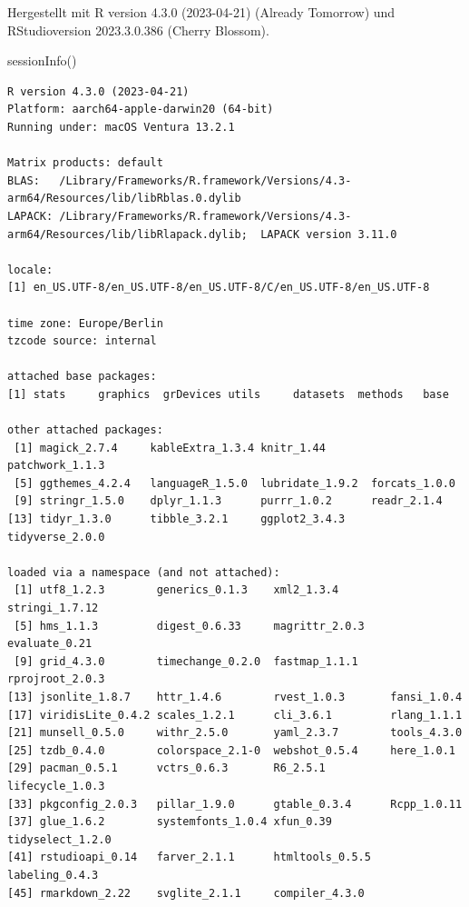 \documentclass[
  letterpaper,
  DIV=11]{scrartcl}
\newenvironment{Shaded}{\begin{snugshade}}{\end{snugshade}}
\newcommand{\FunctionTok}[1]{\textcolor[rgb]{0.28,0.35,0.67}{#1}}
\newcommand{\NormalTok}[1]{\textcolor[rgb]{0.00,0.23,0.31}{#1}}
\theoremstyle{definition}
\theoremstyle{remark}
\begin{document}
Hergestellt mit R version 4.3.0 (2023-04-21) (Already Tomorrow) und
RStudioversion 2023.3.0.386 (Cherry Blossom).

\begin{Shaded}
\begin{Highlighting}[]
\FunctionTok{sessionInfo}\NormalTok{()}
\end{Highlighting}
\end{Shaded}

\begin{verbatim}
R version 4.3.0 (2023-04-21)
Platform: aarch64-apple-darwin20 (64-bit)
Running under: macOS Ventura 13.2.1

Matrix products: default
BLAS:   /Library/Frameworks/R.framework/Versions/4.3-arm64/Resources/lib/libRblas.0.dylib 
LAPACK: /Library/Frameworks/R.framework/Versions/4.3-arm64/Resources/lib/libRlapack.dylib;  LAPACK version 3.11.0

locale:
[1] en_US.UTF-8/en_US.UTF-8/en_US.UTF-8/C/en_US.UTF-8/en_US.UTF-8

time zone: Europe/Berlin
tzcode source: internal

attached base packages:
[1] stats     graphics  grDevices utils     datasets  methods   base     

other attached packages:
 [1] magick_2.7.4     kableExtra_1.3.4 knitr_1.44       patchwork_1.1.3 
 [5] ggthemes_4.2.4   languageR_1.5.0  lubridate_1.9.2  forcats_1.0.0   
 [9] stringr_1.5.0    dplyr_1.1.3      purrr_1.0.2      readr_2.1.4     
[13] tidyr_1.3.0      tibble_3.2.1     ggplot2_3.4.3    tidyverse_2.0.0 

loaded via a namespace (and not attached):
 [1] utf8_1.2.3        generics_0.1.3    xml2_1.3.4        stringi_1.7.12   
 [5] hms_1.1.3         digest_0.6.33     magrittr_2.0.3    evaluate_0.21    
 [9] grid_4.3.0        timechange_0.2.0  fastmap_1.1.1     rprojroot_2.0.3  
[13] jsonlite_1.8.7    httr_1.4.6        rvest_1.0.3       fansi_1.0.4      
[17] viridisLite_0.4.2 scales_1.2.1      cli_3.6.1         rlang_1.1.1      
[21] munsell_0.5.0     withr_2.5.0       yaml_2.3.7        tools_4.3.0      
[25] tzdb_0.4.0        colorspace_2.1-0  webshot_0.5.4     here_1.0.1       
[29] pacman_0.5.1      vctrs_0.6.3       R6_2.5.1          lifecycle_1.0.3  
[33] pkgconfig_2.0.3   pillar_1.9.0      gtable_0.3.4      Rcpp_1.0.11      
[37] glue_1.6.2        systemfonts_1.0.4 xfun_0.39         tidyselect_1.2.0 
[41] rstudioapi_0.14   farver_2.1.1      htmltools_0.5.5   labeling_0.4.3   
[45] rmarkdown_2.22    svglite_2.1.1     compiler_4.3.0   
\end{verbatim}
\end{document}
